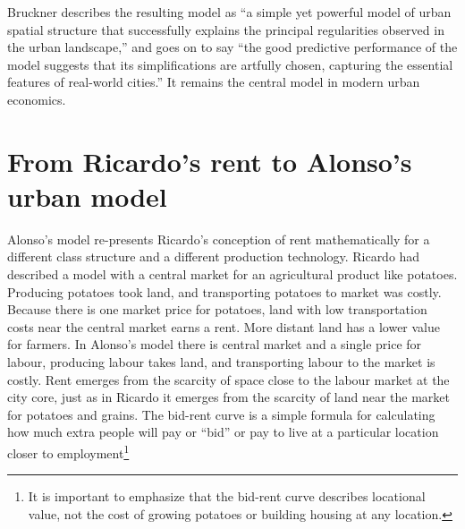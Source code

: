  Bruckner \cite{bruecknerStructureUrbanEquilibria1987} describes the resulting model as ``a simple yet powerful model of urban spatial structure that successfully explains the principal regularities observed in the urban landscape,'' and goes on to say ``the good predictive performance of the model suggests that its simplifications are artfully chosen, capturing the essential features of real-world cities.'' It remains the central model in modern urban economics. 




\section{From Ricardo's rent to Alonso's urban model}

Alonso's model re-presents Ricardo's conception of rent mathematically for a different class structure and a different production technology. Ricardo had described a model with a central market for an agricultural product like potatoes. Producing potatoes took land, and transporting potatoes to market was costly. Because there is one market price for potatoes, land with low transportation costs near the central market earns a rent. More distant land has a lower value for farmers. In Alonso's model there is central market and a single price for labour, producing labour takes land, and transporting labour to the market is costly. Rent emerges from the scarcity of space close to the labour market at the city core, just as  in Ricardo it emerges from the scarcity of land near the market for potatoes and grains. The \gls{bid-rent curve} is a simple formula for calculating how much extra people will pay or ``bid'' or pay to live at a particular location closer to employment\footnote{It is important to emphasize that the bid-rent curve describes  locational value, not the cost of growing potatoes or building housing at any location.}   

